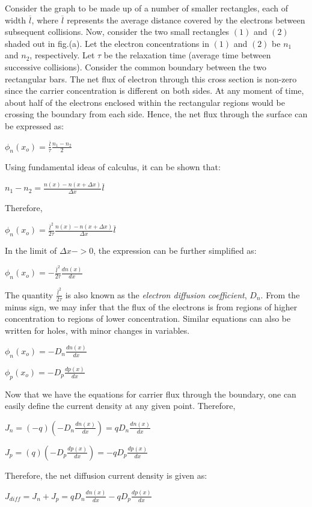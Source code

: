 \documentclass[12 pt]{article}
\begin{document}
Consider the graph to be made up of a number of smaller rectangles, each of width $\overline{l}$, where $\overline{l}$ represents the average distance covered by the electrons between subsequent collisions. Now, consider the two small rectangles $(1)$ and $(2)$ shaded out in fig.(a). Let the electron concentrations in $(1)$ and $(2)$  be $n_{1}$ and $n_{2}$, respectively. Let $\tau$ be the relaxation time (average time between successive collisions). Consider the common boundary between the two rectangular bars. The net flux of electron through this cross section is non-zero since the carrier concentration is different on both sides. At any moment of time, about half of the electrons enclosed within the rectangular regions would be crossing the boundary from each side. Hence, the net flux through the surface can be expressed as:
\begin{center}
    $ \phi_{n}(x_{o}) = \frac{\overline{l}}{\tau}\frac{n_{1}-n_{2}}{2}  $
\end{center}
Using fundamental ideas of calculus, it can be shown that:
\begin{center}
    $  n_{1} - n_{2} = \frac{n(x) - n(x+\Delta x)}{\Delta x}\overline{l}   $
\end{center}
Therefore,
\begin{center}
    $ \phi_{n}(x_{o}) = \frac{\overline{l}^{2}}{2\tau} \frac{n(x) - n(x+\Delta x)}{\Delta x}\overline{l}   $
\end{center}
In the limit of $\Delta x -> 0$, the expression can be further simplified as:
\begin{center}
    $ \phi_{n}(x_{o}) = -\frac{\overline{l}^{2}}{2\tau}\frac{dn(x)}{dx}   $
\end{center}
The quantity $\frac{\overline{l}^{2}}{2\tau}$ is also known as the \emph{electron diffusion coefficient}, $D_{n}$. From the minus sign, we may infer that the flux of the electrons is from regions of higher concentration to regions of lower concentration. Similar equations can also be written for holes, with minor changes in variables.\par
\begin{center}
    $ \phi_{n}(x_{o}) = -D_{n}\frac{dn(x)}{dx}  $
\end{center}
\begin{center}
    $ \phi_{p}(x_{o}) = -D_{p}\frac{dp(x)}{dx} $
\end{center}

Now that we have the equations for carrier flux through the boundary, one can easily define the current density at any given point. Therefore,
\begin{center}
    $  J_{n} = (-q)(-D_{n}\frac{dn(x)}{dx}) = qD_{n}\frac{dn(x)}{dx}  $
\end{center}
\begin{center}
    $  J_{p} = (q)(-D_{p}\frac{dp(x)}{dx}) = -qD_{p}\frac{dp(x)}{dx} $
\end{center}
Therefore, the net diffusion current density is given as:
\begin{center}
    $   J_{diff} = J_{n} + J_{p} = qD_{n}\frac{dn(x)}{dx} - qD_{p}\frac{dp(x)}{dx}   $
\end{center}
\end{document}
